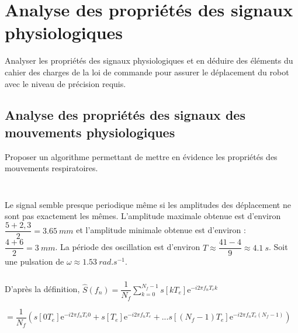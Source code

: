 \documentclass[10pt,fleqn]{article} %
\begin{document}

\vspace{4.5cm}
\pagestyle{fancy}
\thispagestyle{plain}


\def\columnseprulecolor{\color{ocre}}
\setlength{\columnseprule}{0.4pt} 

\section{Analyse des propriétés des signaux physiologiques}

\begin{obj}
Analyser les propriétés des signaux physiologiques et en déduire des éléments du cahier des charges
de la loi de commande pour assurer le déplacement du robot avec le niveau de précision requis.
\end{obj}


\subsection{Analyse des propriétés des signaux des mouvements physiologiques}

\begin{obj}
Proposer un algorithme permettant de mettre en évidence les propriétés des mouvements respiratoires.
\end{obj}
\subparagraph{} ~\\ %

%
%
Le signal semble presque periodique même si les amplitudes des déplacement ne sont pas exactement les mêmes.
L'amplitude maximale obtenue est d'environ $\dfrac{5+2,3}{2}=\SI{3,65}{mm}$ et l'amplitude minimale obtenue est d'environ : $\dfrac{4+6}{2}=\SI{3}{mm}$. 
La période des oscillation est d'environ $
T\approx\dfrac{41-4}{9}\approx \SI{4,1}{s}$. 
Soit une pulsation de $\omega\approx \SI{1,53}{rad.s^{-1}}$.


\subparagraph{} %
D'après la définition, 
$\hat{S}\left( f_n\right)= \dfrac{1}{N_f} \sum \limits_{k=0}^{N_f-1} s\left[kT_e\right] \text{e}^{-i 2 \pi f_nT_e k}$

$= \dfrac{1}{N_f} \left(
 s\left[0 T_e\right] \text{e}^{-i 2 \pi f_nT_e 0} + 
 s\left[T_e\right] \text{e}^{-i 2 \pi f_nT_e } + ... 
 s\left[\left( N_f-1\right)T_e\right] \text{e}^{-i 2 \pi f_nT_e \left( N_f-1\right)}\right)$
\end{document}
